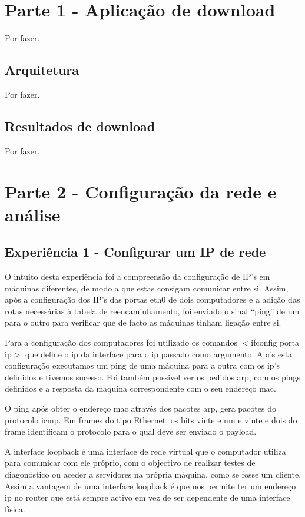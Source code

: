 \documentclass[a4paper]{article}
\begin{document}
\section{Parte 1 - Aplicação de download}
Por fazer.

\subsection{Arquitetura}
Por fazer.

\subsection{Resultados de download}
Por fazer.

\section{Parte 2 - Configuração da rede e análise}

\subsection{Experiência 1 - Configurar um IP de rede}
O intuito desta experiência foi a compreensão da configuração de IP’s em máquinas diferentes, de modo a que estas consigam comunicar entre si. Assim, após a configuração dos IP’s das portas eth0 de dois computadores e a adição das rotas necessárias à tabela de reencaminhamento, foi enviado o sinal “ping” de um para o outro para verificar que de facto as máquinas tinham ligação entre si.

Para a configuração dos computadores foi utilizado os comandos $<$ifconfig porta ip$>$ que define o ip da interface para o ip passado como argumento. Após esta configuração executamos um ping de uma máquina para a outra com os ip’s definidos e tivemos sucesso. Foi também possivel ver os pedidos arp, com os pings definidos e a resposta da maquina correspondente com o seu endereço mac.


O ping após obter o endereço mac através dos pacotes arp, gera pacotes do protocolo icmp. Em frames do tipo Ethernet, os bits vinte e um e vinte e dois do frame identificam o protocolo para o qual deve ser enviado o payload.


A interface loopback é uma interface de rede virtual que o computador utiliza para comunicar com ele próprio, com o objectivo de realizar testes de diagonóstico ou aceder a servidores na própria máquina, como se fosse um cliente. Assim a vantagem de uma interface loopback é que nos permite ter um endereço ip no router que está sempre activo em vez de ser dependente de uma interface física.
\end{document}
